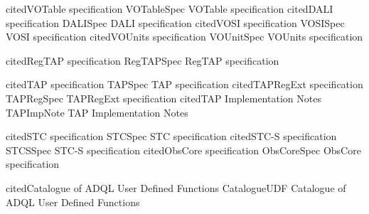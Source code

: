 %
%
%

\def\definestandard#1#2#3{%
  \expandafter\def\csname#1\endcsname{%
    \expandafter\ifx\csname#1cited\endcsname\relax #3 \citep{#2}%
    \expandafter\def\csname#1cited\endcsname{#1}%
      \else #3\fi}}

\definestandard{VOTableSpec}  {2013ivoa.spec.0920O} {VOTable specification}
\definestandard{DALISpec}     {2017ivoa.spec.0517D} {DALI specification}
\definestandard{VOSISpec}     {2017ivoa.spec.0524G} {VOSI specification}
\definestandard{VOUnitSpec}   {2014ivoa.spec.0523D} {VOUnits specification}

\definestandard{RegTAPSpec}   {2014ivoa.spec.1208D} {RegTAP specification}

\definestandard{TAPSpec}      {2010ivoa.spec.0327D} {TAP specification}
\definestandard{TAPRegSpec}   {2012ivoa.spec.0827D} {TAPRegExt specification}
\definestandard{TAPImpNote}   {2013ivoa.rept.1213D} {TAP Implementation Notes}

\definestandard{STCSpec}      {2007ivoa.spec.1030R} {STC specification}
\definestandard{STCSSpec}     {std:STCS}            {STC-S specification}
\definestandard{ObsCoreSpec}  {2017ivoa.spec.0509L} {ObsCore specification}

\definestandard{CatalogueUDF} {2021ivoa.spec.0310C} {Catalogue of ADQL User Defined Functions}

%
\newcommand{\FigureRef}[1]{Figure \ref{#1}}
\newcommand{\SectionRef}[1]{Section \ref{#1}}
\newcommand{\SectionSee}[1]{(see Section \ref{#1})}
\newcommand{\AppendixRef}[1]{Appendix \ref{#1}}
